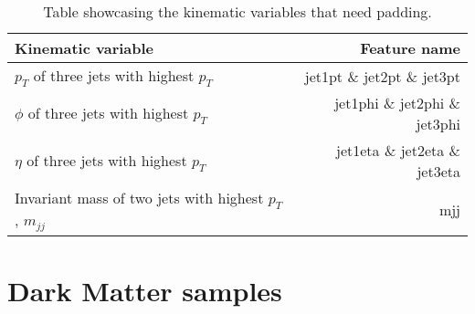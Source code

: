 \documentclass[14pt, a4paper]{book}
\begin{document}
\begin{table}[!h]
    \centering
    \begin{tabular}{l|r}\midrule\midrule
        Kinematic variable                                                      & Feature name          \\\midrule
        $p_T$ of three jets with highest $p_T$                                  & jet1pt \& jet2pt \& jet3pt\\
        $\phi$ of three jets with highest $p_T$                                 & jet1phi \& jet2phi \& jet3phi\\
        $\eta$ of three jets with highest $p_T$                                 & jet1eta \& jet2eta \& jet3eta\\
        Invariant mass of two jets with highest $p_T$, $m_{jj}$                 & mjj\\\midrule\midrule
    \end{tabular}
    \caption[Kinematic variables that need padding]{Table showcasing the kinematic variables that need padding.}
    \label{tab:paddable_variables}
\end{table}


\section{Dark Matter samples}
\end{document}
